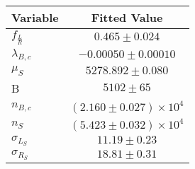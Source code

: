 \begin{tabular}[t]{lc}
\hline
Variable &Fitted Value\\
\hline\hline
$f_{\frac{L}{R}}$&$0.465\pm0.024$\\
\hline
$\lambda_{B,c}$&$-0.00050\pm0.00010$\\
\hline
$\mu_S$&$5278.892\pm0.080$\\
\hline
B&$5102\pm65$\\
\hline
$n_{B,c}$&$(2.160\pm0.027)\times 10^4$\\
\hline
$n_S$&$(5.423\pm0.032)\times 10^4$\\
\hline
$\sigma_{L_S}$&$11.19\pm0.23$\\
\hline
$\sigma_{R_S}$&$18.81\pm0.31$\\
\hline
\end{tabular}